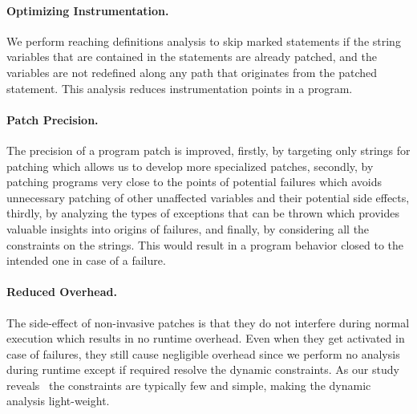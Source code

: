 {\paragraph{Optimizing Instrumentation.} We perform reaching definitions
analysis to skip marked statements
if the string variables that are contained in the statements are already
patched, and the variables
are not redefined along any path that originates from the patched statement.
This analysis reduces
instrumentation points in a program.

\paragraph{Patch Precision.} The precision of a program patch is improved,
firstly, by targeting only strings
for patching which allows us to develop more specialized patches, secondly, by
patching programs very
close to the points of potential failures which avoids unnecessary patching of other
unaffected variables and their potential
side effects, thirdly, by analyzing the types of exceptions that can be thrown which
provides valuable insights into
origins of failures, and finally, by considering all the constraints
on the strings. This would result
in a program behavior closed to the intended one in case of a failure.

\paragraph{Reduced Overhead.} The side-effect of non-invasive patches is that
they do not interfere during
normal execution which results in no runtime overhead. Even when they get
activated in case of failures,
they still cause negligible overhead since we perform no analysis during runtime
except if required resolve the dynamic constraints.
As our study reveals~ the constraints are typically few and simple, making
the dynamic analysis light-weight.
}



















